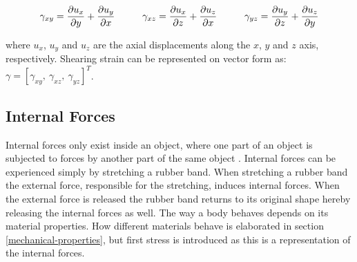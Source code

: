 \begin{equation}
\label{eq:individual-shear-strain}
  \gamma_{xy} = \frac{\partial u_x}{\partial y} +
  \frac{\partial u_y}{\partial x} \hspace{10 mm}
  \gamma_{xz} = \frac{\partial u_x}{\partial z} +
  \frac{\partial u_z}{\partial x} \hspace{10 mm}
  \gamma_{yz} = \frac{\partial u_y}{\partial z} +
  \frac{\partial u_z}{\partial y}
\end{equation}

where $u_x$, $u_y$ and $u_z$ are the axial displacements along the $x$, $y$
and $z$ axis, respectively. Shearing strain can be represented on vector
form as: $\gamma = [ \gamma_{xy}, \ \gamma_{xz}, \ \gamma_{yz} ]^T$.\\




\subsection{Internal Forces}
\label{sec:internal-forces}
Internal forces only exist inside an object, where one part of an
object is subjected to forces by another part of the same object
. 
Internal forces can be experienced simply by stretching a rubber
band. When stretching a rubber band the external force, responsible for
the stretching, induces internal forces. When the external force is
released the rubber band returns to its original shape
hereby releasing the internal forces as well. The way a body behaves
depends on its material properties. How different materials behave is
elaborated in section \vref{mechanical-properties}, but first stress
is introduced as this is a representation of the internal forces.

